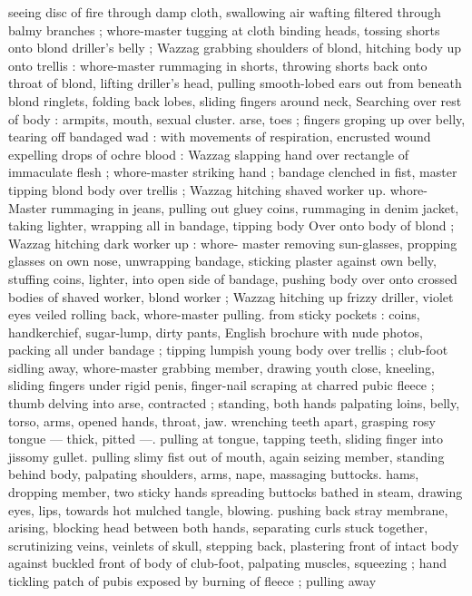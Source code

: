 seeing disc of fire through damp cloth, swallowing air wafting filtered 
through balmy branches ; whore-master tugging at cloth binding 
heads, tossing shorts onto blond driller's belly ; Wazzag grabbing 
shoulders of blond, hitching body up onto trellis : whore-master 
rummaging in shorts, throwing shorts back onto throat of blond, 
lifting driller's head, pulling smooth-lobed ears out from beneath 
blond ringlets, folding back lobes, sliding fingers around neck, 
Searching over rest of body : armpits, mouth, sexual cluster. arse, 
toes ; fingers groping up over belly, tearing off bandaged wad : with 
movements of respiration, encrusted wound expelling drops of ochre 
blood : Wazzag slapping hand over rectangle of immaculate flesh ; 
whore-master striking hand ; bandage clenched in fist, master tipping 
blond body over trellis ; Wazzag hitching shaved worker up. whore- 
Master rummaging in jeans, pulling out gluey coins, rummaging in 
denim jacket, taking lighter, wrapping all in bandage, tipping body 
Over onto body of blond ; Wazzag hitching dark worker up : whore- 
master removing sun-glasses, propping glasses on own nose, 
unwrapping bandage, sticking plaster against own belly, stuffing 
coins, lighter, into open side of bandage, pushing body over onto 
crossed bodies of shaved worker, blond worker ; Wazzag hitching up 
frizzy driller, violet eyes veiled rolling back, whore-master pulling. 
from sticky pockets : coins, handkerchief, sugar-lump, dirty pants, 
English brochure with nude photos, packing all under bandage ; 
tipping lumpish young body over trellis ; club-foot sidling away, 
whore-master grabbing member, drawing youth close, kneeling, 
sliding fingers under rigid penis, finger-nail scraping at charred 
pubic fleece ; thumb delving into arse, contracted ; standing, both 
hands palpating loins, belly, torso, arms, opened hands, throat, jaw. 
wrenching teeth apart, grasping rosy tongue --- thick, pitted ---. 
pulling at tongue, tapping teeth, sliding finger into jissomy gullet. 
pulling slimy fist out of mouth, again seizing member, standing 
behind body, palpating shoulders, arms, nape, massaging buttocks. 
hams, dropping member, two sticky hands spreading buttocks bathed 
in steam, drawing eyes, lips, towards hot mulched tangle, blowing. 
pushing back stray membrane, arising, blocking head between both 
hands, separating curls stuck together, scrutinizing veins, veinlets of 
skull, stepping back, plastering front of intact body against buckled 
front of body of club-foot, palpating muscles, squeezing ; hand 
tickling patch of pubis exposed by burning of fleece ; pulling away 

